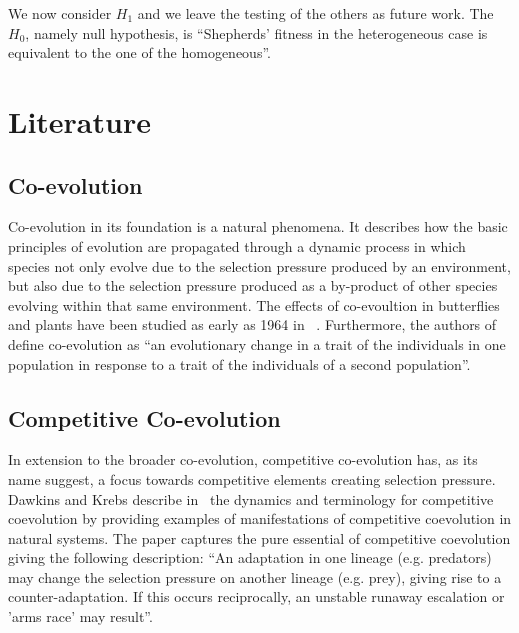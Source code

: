 \documentclass[conference]{IEEEtran}
\begin{document}
We now consider $H_1$ and we leave the testing of the others as future work. 
The $H_0$, namely null hypothesis, is ``Shepherds’ fitness in the heterogeneous case is equivalent to the one of the homogeneous''.

\section{Literature}
 
\subsection{Co-evolution}
Co-evolution in its foundation is a natural phenomena.
It describes how the basic principles of evolution are propagated through a dynamic process in which species not only evolve due to the selection pressure produced by an environment, but also due to the selection pressure produced as a by-product of other species evolving within that same environment.
The effects of co-evoultion in butterflies and plants have been studied as early as 1964 in ~\cite{ehrlich1964butterflies}.
Furthermore, the authors of ~\cite{janzen1980coevolution} define co-evolution as ``an evolutionary change in a trait of the individuals in one population in response to a trait of the individuals of a second population''. 


\subsection{Competitive Co-evolution}
In extension to the broader co-evolution, competitive co-evolution has, as its name suggest, a focus towards competitive elements creating selection pressure.
Dawkins and Krebs describe in~\cite{dawkins1979arms} the dynamics and terminology for competitive coevolution by providing examples of manifestations of competitive coevolution in natural systems. 
The paper captures the pure essential of competitive coevolution giving the following description: ``An adaptation in one lineage (e.g. predators) may change the selection pressure on another lineage (e.g. prey), giving rise to a counter-adaptation. If this occurs reciprocally, an unstable runaway escalation or 'arms race' may result''.
\end{document}
